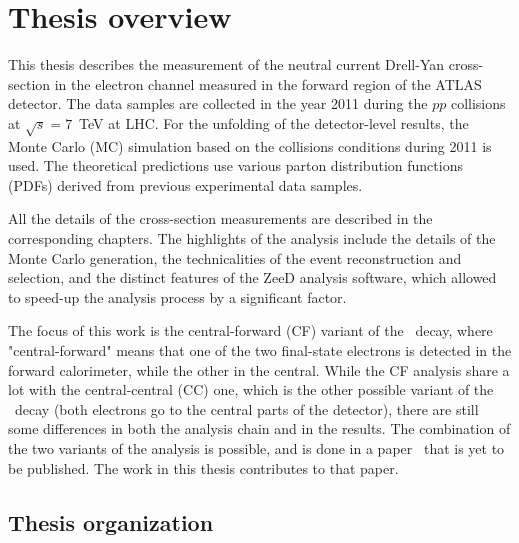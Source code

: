 \chapter{Thesis overview}
\label{sec:TOverview}

This thesis describes the measurement of the neutral current Drell-Yan cross-section in the electron channel measured in the forward region of the ATLAS detector. The data samples are collected in the year 2011 during the $pp$ collisions at $\sqrt{s} = 7$~TeV at LHC. For the unfolding of the detector-level results, the Monte Carlo (MC) simulation based on the collisions conditions during 2011 is used. The theoretical predictions use various parton distribution functions (PDFs) derived from previous experimental data samples.

All the details of the cross-section measurements are described in the corresponding chapters. The highlights of the analysis include the details of the Monte Carlo generation, the technicalities of the event reconstruction and selection, and the distinct features of the ZeeD analysis software, which allowed to speed-up the analysis process by a significant factor.

The focus of this work is the central-forward (CF) variant of the \Zee\ decay, where "central-forward" means that one of the two final-state electrons is detected in the forward calorimeter, while the other in the central. While the CF analysis share a lot with the central-central (CC) one, which is the other possible variant of the \Zee\ decay (both electrons go to the central parts of the detector), there are still some differences in both the analysis chain and in the results. The combination of the two variants of the analysis is possible, and is done in a paper~\cite{lib:wz2011} that is yet to be published. The work in this thesis contributes to that paper.


\section{Thesis organization}
\label{sec:TOrganization}

